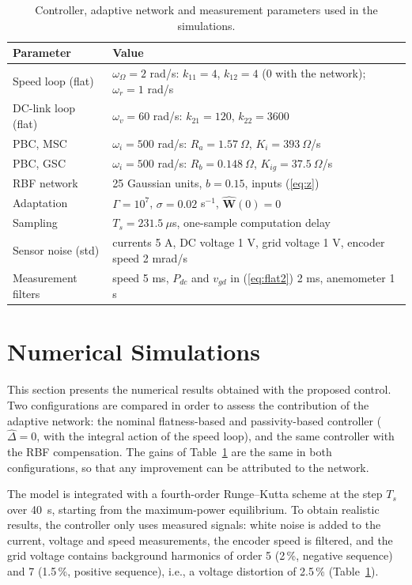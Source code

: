 \documentclass[11pt,a4paper]{article}
\newcommand{\bv}[1]{\mathbf{#1}}
\begin{document}
\begin{table}[!htb]
\caption{Controller, adaptive network and measurement parameters used in the simulations.}
\label{tab:ctrl}
\centering
\begin{tabular}{ll}
\toprule
Parameter & Value\\
\midrule
Speed loop (flat) & $\omega_\Omega=2$ rad/s: $k_{11}=4$, $k_{12}=4$ (0 with the network); $\omega_r=1$ rad/s\\
DC-link loop (flat) & $\omega_v=60$ rad/s: $k_{21}=120$, $k_{22}=3600$\\
PBC, MSC & $\omega_i=500$ rad/s: $R_a=1.57~\Omega$, $K_i=393~\Omega$/s\\
PBC, GSC & $\omega_i=500$ rad/s: $R_b=0.148~\Omega$, $K_{ig}=37.5~\Omega$/s\\
RBF network & 25 Gaussian units, $b=0.15$, inputs (\ref{eq:z})\\
Adaptation & $\Gamma=10^7$, $\sigma=0.02$ s$^{-1}$, $\hat{\bv{W}}(0)=0$\\
Sampling & $T_s=231.5~\mu$s, one-sample computation delay\\
Sensor noise (std) & currents 5 A, DC voltage 1 V, grid voltage 1 V, encoder speed 2 mrad/s\\
Measurement filters & speed 5 ms, $P_{dc}$ and $v_{gd}$ in (\ref{eq:flat2}) 2 ms, anemometer 1 s\\
\bottomrule
\end{tabular}
\end{table}

\section{Numerical Simulations}
This section presents the numerical results obtained with the proposed control. Two configurations are
compared in order to assess the contribution of the adaptive network: the nominal flatness-based and
passivity-based controller ($\hat\Delta=0$, with the integral action of the speed loop), and the same
controller with the RBF compensation. The gains of Table~\ref{tab:ctrl} are the same in both
configurations, so that any improvement can be attributed to the network.

The model is integrated with a fourth-order Runge--Kutta scheme at the step $T_s$ over 40~s, starting
from the maximum-power equilibrium. To obtain realistic results, the controller only uses measured
signals: white noise is added to the current, voltage and speed measurements, the encoder speed is
filtered, and the grid voltage contains background harmonics of order 5 (2\,\%, negative sequence) and
7 (1.5\,\%, positive sequence), i.e., a voltage distortion of 2.5\,\% (Table~\ref{tab:ctrl}).
\end{document}
